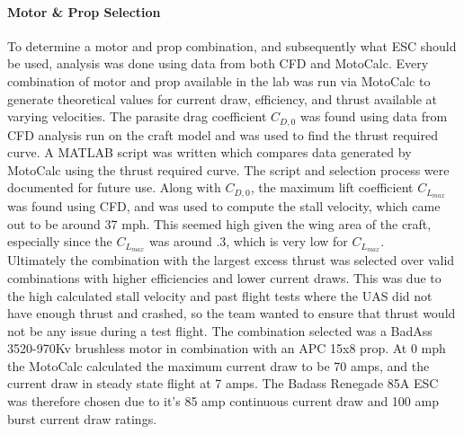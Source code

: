 \documentclass{article}
\begin{document}
\paragraph{Motor \& Prop Selection}
To determine a motor and prop combination, and subsequently what ESC should be used, analysis was done using
data from both CFD and MotoCalc.
Every combination of motor and prop available in the lab was run via MotoCalc to generate theoretical values
for current draw, efficiency, and thrust available at varying velocities. The parasite drag coefficient
$C_{D,0}$ was found using data from CFD analysis run on the craft model and was used to find the thrust
required curve. A MATLAB script was written which compares data generated by MotoCalc using the thrust required
curve. The script and selection process were documented for future use. Along with $C_{D,0}$, the maximum lift
coefficient $C_{L_{max}}$ was found using CFD, and was used to compute the stall velocity, which came out to be
around 37 mph. This seemed high given the wing area of the craft, especially since the $C_{L_{max}}$ was around
.3, which is very low for $C_{L_{max}}$.\\

Ultimately the combination with the largest excess thrust was selected over valid combinations with higher efficiencies and lower current draws. This was due to the high calculated stall velocity and past flight tests where the UAS did not have enough thrust and crashed, so the team wanted to ensure that thrust would not be any issue during a test flight. The combination selected was a BadAss 3520-970Kv brushless motor in combination with an APC 15x8 prop. At 0 mph the MotoCalc calculated the maximum current draw to be 70 amps, and the current draw in steady state flight at 7 amps. The Badass Renegade 85A ESC was therefore chosen due to it's 85 amp continuous current draw and 100 amp burst current draw ratings.

%
\end{document}
